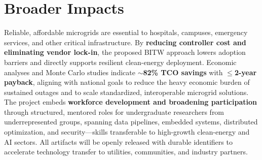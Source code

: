 \documentclass[11pt]{article}
\begin{document}
\section*{Broader Impacts}

Reliable, affordable microgrids are essential to hospitals, campuses, emergency services, and other critical infrastructure. By \textbf{reducing controller cost and eliminating vendor lock-in}, the proposed BITW approach lowers adoption barriers and directly supports resilient clean-energy deployment. Economic analyses and Monte Carlo studies indicate \textbf{$\sim$82\% TCO savings} with \textbf{$\leq$2-year payback}, aligning with national goals to reduce the heavy economic burden of sustained outages and to scale standardized, interoperable microgrid solutions. The project embeds \textbf{workforce development and broadening participation} through structured, mentored roles for undergraduate researchers from underrepresented groups, spanning data pipelines, embedded systems, distributed optimization, and security---skills transferable to high-growth clean-energy and AI sectors. All artifacts will be openly released with durable identifiers to accelerate technology transfer to utilities, communities, and industry partners.
\end{document}
